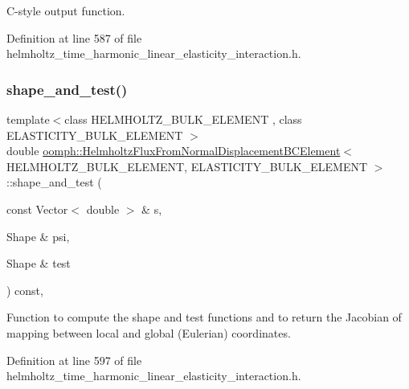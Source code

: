 C-\/style output function. 



Definition at line 587 of file helmholtz\+\_\+time\+\_\+harmonic\+\_\+linear\+\_\+elasticity\+\_\+interaction.\+h.

\mbox{\label{classoomph_1_1HelmholtzFluxFromNormalDisplacementBCElement_a91ee0e36a8c127d83269a08d6740dfb2}} 
\subsubsection{\texorpdfstring{shape\+\_\+and\+\_\+test()}{shape\_and\_test()}}
{\footnotesize\ttfamily template$<$class H\+E\+L\+M\+H\+O\+L\+T\+Z\+\_\+\+B\+U\+L\+K\+\_\+\+E\+L\+E\+M\+E\+NT , class E\+L\+A\+S\+T\+I\+C\+I\+T\+Y\+\_\+\+B\+U\+L\+K\+\_\+\+E\+L\+E\+M\+E\+NT $>$ \\
double \hyperlink{classoomph_1_1HelmholtzFluxFromNormalDisplacementBCElement}{oomph\+::\+Helmholtz\+Flux\+From\+Normal\+Displacement\+B\+C\+Element}$<$ H\+E\+L\+M\+H\+O\+L\+T\+Z\+\_\+\+B\+U\+L\+K\+\_\+\+E\+L\+E\+M\+E\+NT, E\+L\+A\+S\+T\+I\+C\+I\+T\+Y\+\_\+\+B\+U\+L\+K\+\_\+\+E\+L\+E\+M\+E\+NT $>$\+::shape\+\_\+and\+\_\+test (\begin{DoxyParamCaption}\item[{const Vector$<$ double $>$ \&}]{s,  }\item[{Shape \&}]{psi,  }\item[{Shape \&}]{test }\end{DoxyParamCaption}) const\hspace{0.3cm}{\ttfamily [inline]}, {\ttfamily [protected]}}



Function to compute the shape and test functions and to return the Jacobian of mapping between local and global (Eulerian) coordinates. 



Definition at line 597 of file helmholtz\+\_\+time\+\_\+harmonic\+\_\+linear\+\_\+elasticity\+\_\+interaction.\+h.



